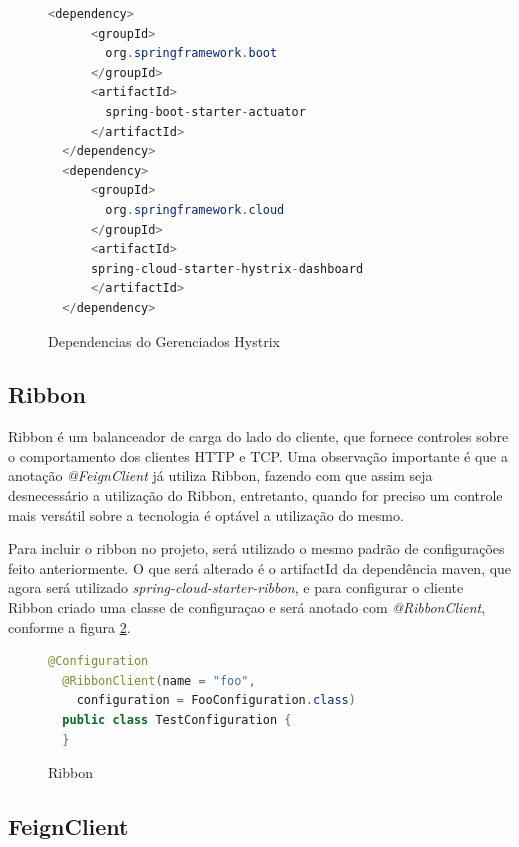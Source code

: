 \documentclass[journal]{IEEEtran}
\begin{document}
\begin{figure}[h]
\centering

\begin{lstlisting}[language=Java]
  <dependency>
      <groupId>
        org.springframework.boot
      </groupId>
      <artifactId>
        spring-boot-starter-actuator
      </artifactId>
  </dependency>
  <dependency>
      <groupId>
        org.springframework.cloud
      </groupId>
      <artifactId>
      spring-cloud-starter-hystrix-dashboard
      </artifactId>
  </dependency>
\end{lstlisting}

\caption{Dependencias do Gerenciados Hystrix}
\label{alg:figuraonze}
\end{figure}

\subsection{Ribbon}

Ribbon é um  balanceador de carga do lado do cliente, que fornece controles sobre o comportamento dos clientes HTTP e TCP. Uma observação importante é que a anotação \emph{@FeignClient} já utiliza Ribbon, fazendo com que assim seja desnecessário a utilização do Ribbon, entretanto, quando for preciso um controle mais versátil sobre a tecnologia é optável a utilização do mesmo.

Para incluir o ribbon no projeto, será utilizado o mesmo padrão de configurações feito anteriormente. O que será alterado é o artifactId da dependência maven, que agora será utilizado \emph{spring-cloud-starter-ribbon}, e para configurar o cliente Ribbon criado uma classe de configuraçao e será anotado com \emph{@RibbonClient}, conforme a figura \ref{alg:figuradoze}.

\begin{figure}[h]
\centering

\begin{lstlisting}[language=Java]
  @Configuration
  @RibbonClient(name = "foo", 
    configuration = FooConfiguration.class)
  public class TestConfiguration {
  }
\end{lstlisting}

\caption{Ribbon}
\label{alg:figuradoze}
\end{figure}

\subsection{FeignClient}
\end{document}
